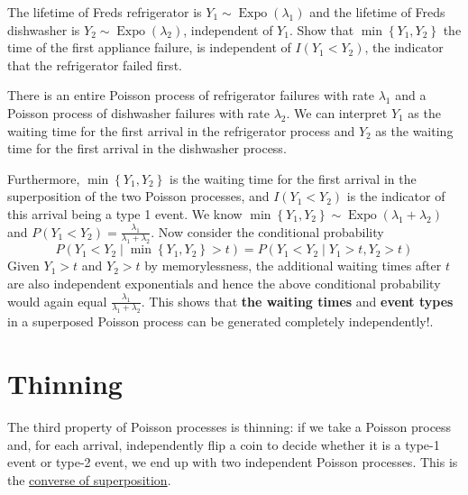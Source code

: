 \documentclass[11pt]{elegantbook}
\begin{document}
\begin{example}
The lifetime of Freds refrigerator is $Y_1 \sim \operatorname{Expo}\left(\lambda_1\right)$ and the lifetime of Freds dishwasher is $Y_2 \sim \operatorname{Expo}\left(\lambda_2\right)$, independent of $Y_1$. Show that $\min \left\{Y_1, Y_2\right\}$ the time of the first appliance failure, is independent of $I\left(Y_1<Y_2\right)$, the indicator that the refrigerator failed first.

\begin{solution}
    There is an entire Poisson process of refrigerator failures with rate $\lambda_1$ and a Poisson process of dishwasher failures with rate $\lambda_2$. We can interpret $Y_1$ as the waiting time for the first arrival in the refrigerator process and $Y_2$ as the waiting time for the first arrival in the dishwasher process.

    Furthermore, $\min \left\{Y_1, Y_2\right\}$ is the waiting time for the first arrival in the superposition of the two Poisson processes, and $I\left(Y_1<Y_2\right)$ is the indicator of this arrival being a type 1 event. We know $\min \left\{Y_1, Y_2\right\} \sim \operatorname{Expo}\left(\lambda_1+\lambda_2\right)$ and $P\left(Y_1<Y_2\right)=\frac{\lambda_1}{\lambda_1+\lambda_2}$. Now consider the conditional probability
    $$
    P\left(Y_1<Y_2 \mid \min \left\{Y_1, Y_2\right\}>t\right)=P\left(Y_1<Y_2 \mid Y_1>t, Y_2>t\right)
    $$
    Given $Y_1>t$ and $Y_2>t$ by memorylessness, the additional waiting times after $t$ are also independent exponentials and hence the above conditional probability would again equal $\frac{\lambda_1}{\lambda_1+\lambda_2}$. This shows that \textbf{the waiting times} and \textbf{event types} in a superposed Poisson process can be generated completely independently!.
\end{solution}
\end{example}

\section{Thinning}
The third property of Poisson processes is thinning: if we take a Poisson process and, for each arrival, independently flip a coin to decide whether it is a type-1 event or type-2 event, we end up with two independent Poisson processes. This is the \underline{converse of superposition}.
\end{document}
